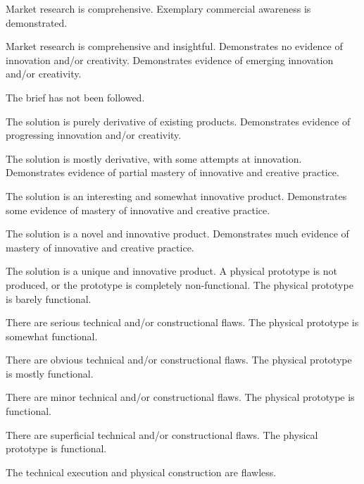 \documentclass{../fal_assignment}
\begin{document}
\begin{markingrubric}
            \par Market research is comprehensive.
        \grade Exemplary commercial awareness is demonstrated.
            \par Market research is comprehensive and insightful.
        \grade\fail Demonstrates no evidence of innovation and/or creativity.
        \grade Demonstrates evidence of emerging innovation and/or creativity.
            \par The brief has not been followed.
            \par The solution is purely derivative of existing products.
        \grade Demonstrates evidence of progressing innovation and/or creativity.
            \par The solution is mostly derivative, with some attempts at innovation.
        \grade Demonstrates evidence of partial mastery of innovative and creative practice.
            \par The solution is an interesting and somewhat innovative product.
        \grade Demonstrates some evidence of mastery of innovative and creative practice.
            \par The solution is a novel and innovative product.
        \grade Demonstrates much evidence of mastery of innovative and creative practice.
            \par The solution is a unique and innovative product.
        \grade\fail A physical prototype is not produced, or the prototype is completely non-functional.
        \grade The physical prototype is barely functional.
            \par There are serious technical and/or constructional flaws.
        \grade The physical prototype is somewhat functional.
            \par There are obvious technical and/or constructional flaws.
        \grade The physical prototype is mostly functional.
            \par There are minor technical and/or constructional flaws.
        \grade The physical prototype is functional.
            \par There are superficial technical and/or constructional flaws.
        \grade The physical prototype is functional.
            \par The technical execution and physical construction are flawless.

\end{markingrubric}
\end{document}

